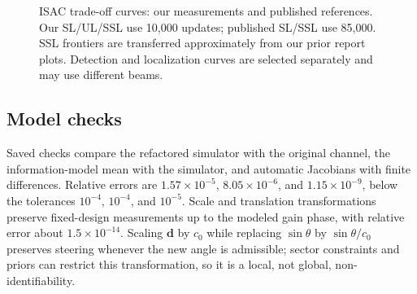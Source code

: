 \documentclass[conference]{IEEEtran}
\begin{document}
\begin{figure}[t]\centering
{}
\caption{ISAC trade-off curves: our measurements and published references. Our SL/UL/SSL use 10,000 updates; published SL/SSL use 85,000. SSL frontiers are transferred approximately from our prior report plots. Detection and localization curves are selected separately and may use different beams.}
\label{fig:isac}
\end{figure}

\subsection{Model checks}
Saved checks compare the refactored simulator with the original channel, the information-model mean with the simulator, and automatic Jacobians with finite differences. Relative errors are $1.57\times10^{-5}$, $8.05\times10^{-6}$, and $1.15\times10^{-9}$, below the tolerances $10^{-4}$, $10^{-4}$, and $10^{-5}$. Scale and translation transformations preserve fixed-design measurements up to the modeled gain phase, with relative error about $1.5\times10^{-14}$. Scaling $\mathbf d$ by $c_0$ while replacing $\sin\theta$ by $\sin\theta/c_0$ preserves steering whenever the new angle is admissible; sector constraints and priors can restrict this transformation, so it is a local, not global, non-identifiability.
\end{document}
